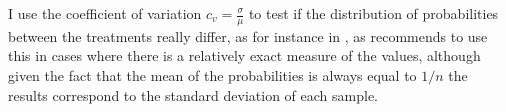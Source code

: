 I use the coefficient of variation $c_v=\frac{\sigma}{\mu}$ to test if the distribution of probabilities between the treatments really differ, as for instance in \cite{rassenti2000}, as \cite{bendel1989} recommends to use this in cases where there is a relatively exact measure of the values, although given the fact that the mean of the probabilities is always equal to $1/n$ the results correspond to the standard deviation of each sample.
 